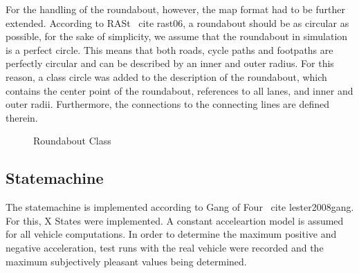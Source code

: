 \documentclass[11pt,oneside,openright]{mpreport}
\begin{document}
For the handling of the roundabout, however, the map format had to be further extended. According to RASt \ cite {rast06}, a roundabout should be as circular as possible, 
for the sake of simplicity, we assume that the roundabout in simulation is a perfect circle. This means that both roads,
cycle paths and footpaths are perfectly circular and can be described by an inner and outer radius. For this reason, a class circle was added to the description of the roundabout,
which contains the center point of the roundabout, references to all lanes, and inner and outer radii. Furthermore, the connections to the connecting lines are defined therein.

\begin{figure}[!ht]
\caption{Roundabout Class}
\label{roundabout_class}
\end{figure}

\subsection{Statemachine}

% 
The statemachine is implemented according to Gang of Four \ cite {lester2008gang}. For this, X States were implemented. 
A constant acceleartion model is assumed for all vehicle computations. In order to determine the maximum positive and negative acceleration, 
test runs with the real vehicle  were recorded and the maximum subjectively pleasant values being determined.
\end{document}
